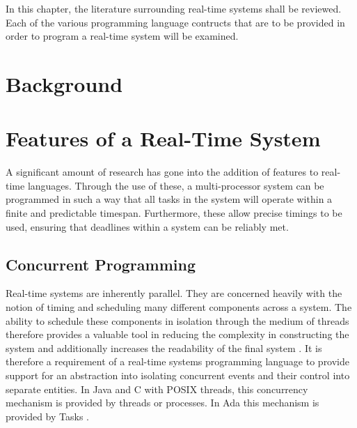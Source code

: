 


In this chapter, the literature surrounding real-time systems shall be reviewed. 
Each of the various programming language contructs that are to be provided in 
order to program a real-time system will be examined. 

\section{Background}


\section{Features of a Real-Time System}

A significant amount of research has gone into the addition of features to 
real-time languages. Through the use of these, a multi-processor system can be 
programmed in such a way that all tasks in the system will operate within a finite 
and predictable timespan. Furthermore, these allow precise timings to be used, 
ensuring that deadlines within a system can be reliably met. 
\subsection{Concurrent Programming}
Real-time systems are inherently parallel. They are concerned heavily with 
the notion of timing and scheduling many different components across a system. 
The ability to schedule these components in isolation through the medium 
of threads therefore provides a valuable tool in reducing the complexity in 
constructing the system and additionally increases the readability of the 
final system 
\cite[p132]{real-time-systems}. It is therefore a requirement of a real-time systems 
programming language to provide support for an abstraction into isolating 
concurrent events and their control into separate entities. 
In Java and C with POSIX threads, this concurrency mechanism is provided by threads or processes. 
In Ada this mechanism is provided by Tasks 
\cite[p251]{gehani1989concurrent}.

